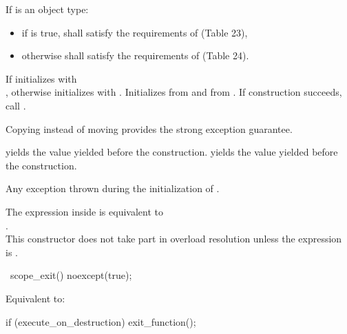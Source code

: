 \documentclass[ebook,11pt,article]{memoir}
\begin{document}
\begin{itemdescr}
\pnum
\requires
If  is an object type:
\begin{itemize}
 \item
if  is true,  shall satisfy the requirements of  (Table 23), 
\item
otherwise  shall satisfy the requirements of  (Table 24).
\end{itemize}

\pnum
\effects %
If  initializes  with \\
,
otherwise initializes  with . Initializes  from  and  from .
If construction succeeds, call .
\begin{note}
Copying instead of moving provides the strong exception guarantee.
\end{note}


\pnum
\postconditions
{} yields the value  yielded before the construction. 
 yields the value  yielded before the construction.

\pnum
\throws Any exception thrown during the initialization of .

\pnum
\remarks 
The expression inside  is equivalent to \\
.\\
This constructor does not take part in overload resolution unless the expression \\
is .
\end{itemdescr}

\begin{itemdecl}
~scope_exit() noexcept(true);
\end{itemdecl}

\begin{itemdescr}
\pnum
\effects 
Equivalent to:
\begin{codeblock}
if (execute_on_destruction)
	exit_function();
\end{codeblock}
\end{itemdescr}
\end{document}
